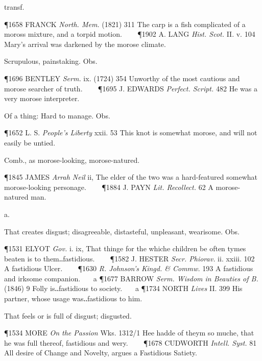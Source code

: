 \begin{description}[wide, labelwidth=!, labelindent=0pt]
\begin{myenumerate}
 transf.

\P 1658 FRANCK  \textit{North. Mem.} (1821) 311 The carp is a fish complicated of a moross mixture, and a torpid motion.    
\P 1902 A. LANG  \textit{Hist. Scot.} II. v. 104 Mary's arrival was darkened by the morose climate.

 Scrupulous, painstaking. Obs.

\P 1696 BENTLEY  \textit{Serm.} ix. (1724) 354 Unworthy of the most cautious and morose searcher of truth.    
\P 1695 J. EDWARDS  \textit{Perfect. Script.} 482 He was a very morose interpreter.

 Of a thing: Hard to manage. Obs.

\P 1652 L. S. \textit{People's  Liberty} xxii. 53 This knot is somewhat morose, and will not easily be untied.

 Comb., as morose-looking, morose-natured.

\P 1845 JAMES  \textit{Arrah Neil} ii, The elder of the two was a hard-featured somewhat morose-looking personage.    
\P 1884 J. PAYN  \textit{Lit. Recollect.} 62 A morose-natured man.
\end{myenumerate}


 a.

\noindent {}

\vspace{-0.3cm}

\begin{myenumerate}

 That creates disgust; disagreeable, distasteful, unpleasant, wearisome. Obs.

\P 1531 ELYOT  \textit{Gov.} i. ix, That thinge for the whiche children be often tymes beaten is to them‥fastidious.    
\P 1582 J. HESTER  \textit{Secr. Phiorav.} ii. xxiii. 102 A fastidious Ulcer.    
\P 1630 \textit{R. Johnson's  Kingd. \& Commw.} 193 A fastidious and irksome companion.    a 
\P 1677 BARROW  \textit{Serm. Wisdom in Beauties of B.} (1846) 9 Folly is‥fastidious to society.    a 
\P 1734 NORTH  \textit{Lives} II. 399 His partner, whose usage was‥fastidious to him.

  That feels or is full of disgust; disgusted.

\P 1534 MORE  \textit{On the Passion} Wks. 1312/1 Hee hadde of theym so muche, that he was full thereof, fastidious and wery.    
\P 1678 CUDWORTH  \textit{Intell. Syst.} 81 All desire of Change and Novelty, argues a Fastidious Satiety.


\end{myenumerate}
\end{description}
